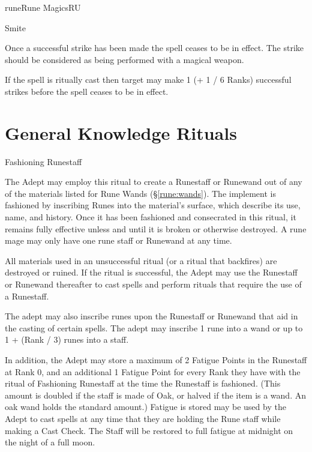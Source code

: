 \begin{College}[2.2]{rune}{Rune Magics}{RU}
\begin{spell}[G-7]{Smite}
\begin{effects}
Once a successful strike has been made the spell ceases to be in
effect. The strike should be considered as being performed with a
magical weapon.

If the spell is ritually cast then target may make 1 (+ 1 / 6 Ranks)
successful strikes before the spell ceases to be in effect.
\end{effects}
\end{spell}

\section{General Knowledge Rituals}

\begin{ritual}[Q-1]{Fashioning Runestaff}

\begin{effects}
The Adept may employ this ritual to create a Runestaff or Runewand out
of any of the materials listed for Rune Wands (\S\ref{rune:wands}).
The implement is fashioned by inscribing Runes into the material’s
surface, which describe its use, name, and history.  Once it has been
fashioned and consecrated in this ritual, it remains fully effective
unless and until it is broken or otherwise destroyed.  A rune mage may
only have one rune staff or Runewand at any time.

All materials used in an unsuccessful ritual (or a ritual that
backfires) are destroyed or ruined. If the ritual is successful, the
Adept may use the Runestaff or Runewand thereafter to cast spells and
perform rituals that require the use of a Runestaff.

The adept may also inscribe runes upon the Runestaff or Runewand that
aid in the casting of certain spells. The adept may inscribe 1 rune
into a wand or up to 1 + (Rank / 3) runes into a staff.

In addition, the Adept may store a maximum of 2 Fatigue Points in the
Runestaff at Rank 0, and an additional 1 Fatigue Point for every Rank
they have with the ritual of Fashioning Runestaff at the time the
Runestaff is fashioned.  (This amount is doubled if the staff is made
of Oak, or halved if the item is a wand.  An oak wand holds the
standard amount.)  Fatigue is stored may be used by the Adept to cast
spells at any time that they are holding the Rune staff while making a
Cast Check. The Staff will be restored to full fatigue at midnight on
the night of a full moon.
\end{effects}
\end{ritual}


\end{College}
